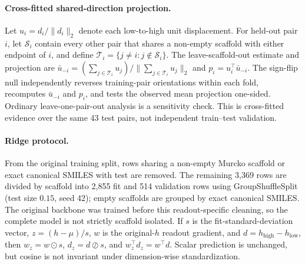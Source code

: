 \documentclass[11pt]{article}
\begin{document}
\paragraph{Cross-fitted shared-direction projection.} Let $u_i=d_i/\lVert d_i\rVert_2$ denote each low-to-high unit displacement. For held-out pair $i$, let $\mathcal S_i$ contain every other pair that shares a non-empty scaffold with either endpoint of $i$, and define $\mathcal T_i=\{j\neq i:j\notin\mathcal S_i\}$. The leave-scaffold-out estimate and projection are $\bar u_{-i}=(\sum_{j\in\mathcal T_i}u_j)/\lVert\sum_{j\in\mathcal T_i}u_j\rVert_2$ and $p_i=u_i^\top\bar u_{-i}$. The sign-flip null independently reverses training-pair orientations within each fold, recomputes $\bar u_{-i}$ and $p_i$, and tests the observed mean projection one-sided. Ordinary leave-one-pair-out analysis is a sensitivity check. This is cross-fitted evidence over the same 43 test pairs, not independent train--test validation.
\label{sec:shared_projection_appendix}

\paragraph{Ridge protocol.} From the original training split, rows sharing a non-empty Murcko scaffold or exact canonical SMILES with test are removed. The remaining 3{,}369 rows are divided by scaffold into 2{,}855 fit and 514 validation rows using GroupShuffleSplit (test size $0.15$, seed 42); empty scaffolds are grouped by exact canonical SMILES. The original backbone was trained before this readout-specific cleaning, so the complete model is not strictly scaffold isolated. If $s$ is the fit-standard-deviation vector, $z=(h-\mu)/s$, $w$ is the original-$h$ readout gradient, and $d=h_{\mathrm{high}}-h_{\mathrm{low}}$, then $w_z=w\odot s$, $d_z=d\oslash s$, and $w_z^\top d_z=w^\top d$. Scalar prediction is unchanged, but cosine is not invariant under dimension-wise standardization.
\label{sec:ridge_protocol_appendix}
\end{document}
